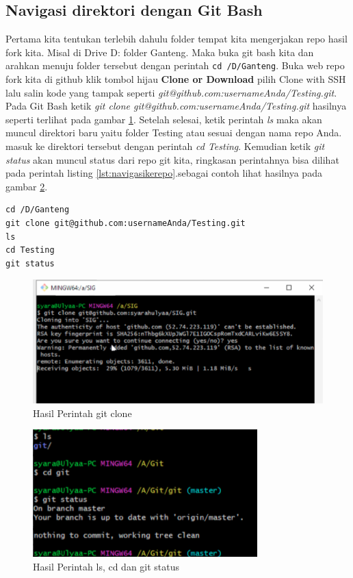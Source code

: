 \subsection{Navigasi direktori dengan Git Bash}
Pertama kita tentukan terlebih dahulu folder tempat kita mengerjakan repo hasil fork kita. Misal di Drive D: folder Ganteng. Maka buka git bash kita dan arahkan menuju folder tersebut dengan perintah 
\verb|cd /D/Ganteng|.
Buka web repo fork kita di github klik tombol hijau \textbf{Clone or Download} pilih Clone with SSH lalu salin kode yang tampak seperti \textit{git@github.com:usernameAnda/Testing.git}. Pada Git Bash ketik \textit{git clone git@github.com:usernameAnda/Testing.git} hasilnya seperti terlihat pada gambar \ref{gitclone}. Setelah selesai, ketik perintah \textit{ls} maka akan muncul direktori baru yaitu folder Testing atau sesuai dengan nama repo Anda. masuk ke direktori tersebut dengan perintah \textit{cd Testing}. Kemudian ketik \textit{git status} akan muncul status dari repo git kita, ringkasan perintahnya bisa dilihat pada perintah listing \ref{lst:navigasikerepo}.sebagai contoh lihat hasilnya pada gambar \ref{lscdstatus}.

\begin{lstlisting}[caption=Navigasi direktori menuju repositori,label={lst:navigasikerepo}]
cd /D/Ganteng
git clone git@github.com:usernameAnda/Testing.git
ls 
cd Testing
git status
\end{lstlisting}

\begin{figure}[!htbp]
\centerline{\includegraphics[width=.75\textwidth]{Figures/gitclone}}
\caption{Hasil Perintah git clone}
\label{gitclone}
\end{figure}
\begin{figure}[!htbp]
\centerline{\includegraphics[width=.75\textwidth]{Figures/lscdstatus}}
\caption{Hasil Perintah ls, cd dan git status}
\label{lscdstatus}
\end{figure}

